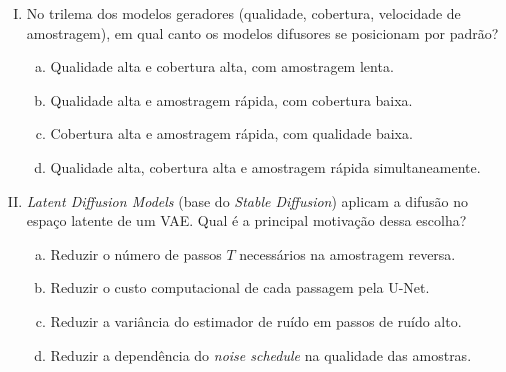 \documentclass{dlproblemset}
\begin{document}
\begin{enumerate}[I)]
\item No trilema dos modelos geradores (qualidade, cobertura, velocidade de amostragem), em qual canto os modelos difusores se posicionam por padrão?
\begin{enumerate}[(a)]
    \item Qualidade alta e cobertura alta, com amostragem lenta.
    \item Qualidade alta e amostragem rápida, com cobertura baixa.
    \item Cobertura alta e amostragem rápida, com qualidade baixa.
    \item Qualidade alta, cobertura alta e amostragem rápida simultaneamente.
\end{enumerate}

\item \textit{Latent Diffusion Models} (base do \textit{Stable Diffusion}) aplicam a difusão no espaço latente de um VAE. Qual é a principal motivação dessa escolha?
\begin{enumerate}[(a)]
    \item Reduzir o número de passos $T$ necessários na amostragem reversa.
    \item Reduzir o custo computacional de cada passagem pela U-Net.
    \item Reduzir a variância do estimador de ruído em passos de ruído alto.
    \item Reduzir a dependência do \textit{noise schedule} na qualidade das amostras.
\end{enumerate}



\end{enumerate}
\end{document}
